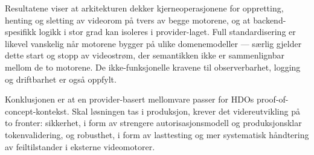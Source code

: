Resultatene viser at arkitekturen dekker kjerneoperasjonene for oppretting, henting og sletting av videorom på tvers av begge motorene, og at backend-spesifikk logikk i stor grad kan isoleres i provider-laget. Full standardisering er likevel vanskelig når motorene bygger på ulike domenemodeller — særlig gjelder dette start og stopp av videostrøm, der semantikken ikke er sammenlignbar mellom de to motorene. De ikke-funksjonelle kravene til observerbarhet, logging og driftbarhet er også oppfylt.

Konklusjonen er at en provider-basert mellomvare passer for HDOs proof-of-concept-kontekst. Skal løsningen tas i produksjon, krever det videreutvikling på to fronter: sikkerhet, i form av strengere autorisasjonsmodell og produksjonsklar tokenvalidering, og robusthet, i form av lasttesting og mer systematisk håndtering av feiltilstander i eksterne videomotorer.